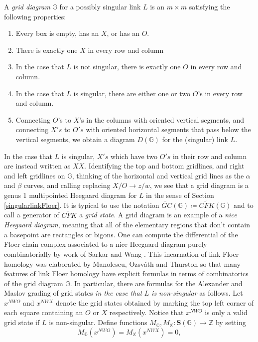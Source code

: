 \documentclass[11pt]{amsart}
\theoremstyle{definition}
\theoremstyle{remark}
\def\Z{\mathbb{Z}}
\numberwithin{equation}{section}
\begin{document}
A \emph{grid diagram} $\mathbb{G}$ for a possibly singular link $L$ is an $m\times m$ satisfying the following properties:
\begin{enumerate}
    \item Every box is empty, has an $X$, or has an $O$.
    \item There is exactly one $X$ in every row and column
    \item In the case that $L$ is not singular, there is exactly one $O$ in every row and column.
    \item In the case that $L$ is singular, there are either one or two $O$'s
 in every row and column. 
    \item Connecting $O$'s to $X$'s in the columns with oriented vertical segments, and connecting $X's$ to $O's$ with oriented horizontal segments that pass below the vertical segments, we obtain a diagram $D(\mathbb{G})$ for the (singular) link $L$.
 \end{enumerate}In the case that $L$ is singular, $X's$ which have two $O's$ in their row and column are instead written as $XX$. Identifying the top and bottom gridlines, and right and left gridlines on $\mathbb{G}$, thinking of the horizontal and vertical grid lines as the $\alpha$ and $\beta$ curves, and calling replacing $X/O\to z/w$, we see that a grid diagram is a genus 1 multipointed Heegaard diagram for $L$ in the sense of Section \ref{singularlinkFloer}. It is typical to use the notation $\widetilde{GC}(\mathbb{G})\coloneq\widetilde{CFK}(\mathbb{G})$ and to call a generator of $\widetilde{CFK}$ a \emph{grid state}. A grid diagram is an example of a \emph{nice Heegaard diagram}, meaning that all of the elementary regions that don't contain a basepoint are rectangles or bigons. One can compute the differential of the Floer chain complex associated to a nice Heegaard diagram purely combinatorially by work of Sarkar and Wang \cite{SWNice}. This incarnation of link Floer homology was elaborated by Manolescu, Ozsv\'{a}th and Thurston so that many features of link Floer homology have explicit formulas in terms of combinatorics of the grid diagram $\mathbb{G}.$ In particular, there are formulas for the Alexander and Maslov grading of grid states  \emph{in the case that}  $L$ \emph{is non-singular} as follows. Let $x^{NWO}$ and $x^{NWX}$ denote the grid states obtained by marking the top left corner of each square containing an $O$ or $X$ respectively. Notice that $x^{NWO}$ is only a valid grid state if $L$ is non-singular. Define functions $M_{\mathbb{O}}, M_{\mathbb{X}}\colon \mathbf{S}(\mathbb{G})\to \Z$ by setting \begin{equation}\label{Maslov normalization}M_{\mathbb{O}}(x^{NWO})=M_{\mathbb{X}}(x^{NWX})=0,\end{equation}
\end{document}
